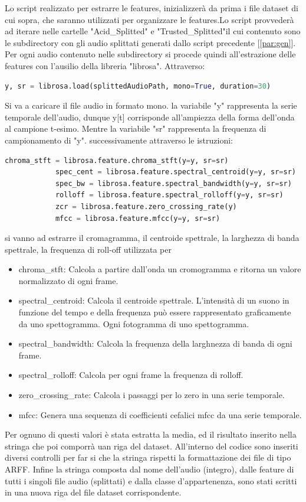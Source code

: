 Lo script realizzato per estrarre le features, inizializzerà da prima i file dataset di cui sopra, che saranno utilizzati per organizzare le features.Lo script provvederà ad iterare nelle cartelle "Acid\_Splitted" e "Trusted\_Splitted"il cui contenuto sono le subdirectory con gli audio splittati generati dallo script precedente [\ref{par:gen}]. Per ogni audio contenuto nelle subdirectory si procede quindi all'estrazione delle features con l'ausilio della libreria "librosa"\cite{libosa}.
Attraverso:
\begin{lstlisting}[language=Python]
 y, sr = librosa.load(splittedAudioPath, mono=True, duration=30)
\end{lstlisting}
Si va a caricare il file audio in formato mono. la variabile "y" rappresenta la serie temporale dell'audio, dunque y[t] corrisponde all'ampiezza della forma dell'onda al campione t-esimo. Mentre la variabile "sr" rappresenta la frequenza di campionamento di "y". 
successivamente attraverso le istruzioni: 
\begin{lstlisting}[language=Python]
            chroma_stft = librosa.feature.chroma_stft(y=y, sr=sr)
            spec_cent = librosa.feature.spectral_centroid(y=y, sr=sr)
            spec_bw = librosa.feature.spectral_bandwidth(y=y, sr=sr)
            rolloff = librosa.feature.spectral_rolloff(y=y, sr=sr)
            zcr = librosa.feature.zero_crossing_rate(y)
            mfcc = librosa.feature.mfcc(y=y, sr=sr)
\end{lstlisting}
si vanno ad estrarre il cromagramma, il centroide spettrale, la larghezza di banda spettrale, la frequenza di roll-off utilizzata per 
\begin{itemize}
\item chroma\_stft: Calcola a partire dall'onda un cromogramma e ritorna un valore normalizzato di ogni frame. 
\item spectral\_centroid: Calcola il centroide spettrale. L'intensità di un suono in funzione del tempo e della frequenza può essere rappresentato graficamente da uno spettogramma. Ogni fotogramma di uno spettogramma.
\item spectral\_bandwidth: Calcola la frequenza della larghnezza di banda di ogni frame.
\item spectral\_rolloff: Calcola per ogni frame la frequenza di rolloff.
\item zero\_crossing\_rate: Calcola i passaggi per lo zero in una serie temporale.
\item mfcc: Genera una sequenza di coefficienti cefalici mfcc da una serie temporale.
\end{itemize}
Per ognuno di questi valori è stata estratta la media, ed il risultato inserito nella stringa che poi comporrà uan riga del dataset. All'interno del codice sono inseriti diversi controlli per far si che la stringa rispetti la formattazione dei file di tipo ARFF. Infine la stringa composta dal nome dell'audio (integro), dalle feature di tutti i singoli file audio (splittati) e dalla classe d'appartenenza, sono stati scritti in una nuova riga del file dataset corrispondente. 


